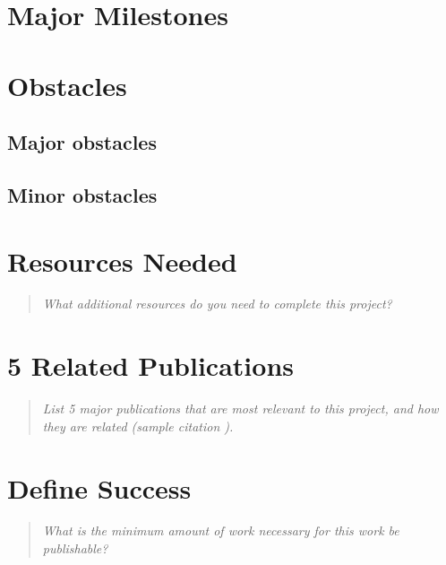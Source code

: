 \documentclass{proc}
\begin{document}
\section{Major Milestones}

\section{Obstacles}

\subsection{Major obstacles} %

\subsection{Minor obstacles}

\section{Resources Needed}
\begin{quote}
\textit{What additional resources do you need to complete this project?}
\end{quote}

\section{5 Related Publications}
\begin{quote}
\textit{List 5 major publications that are most relevant to this project, and how they are related (sample citation \cite{wijk2005value}).}
\end{quote}

\section{Define Success}
\begin{quote}
\textit{What is the minimum amount of work necessary for this work be publishable?}
\end{quote}



\end{document}
